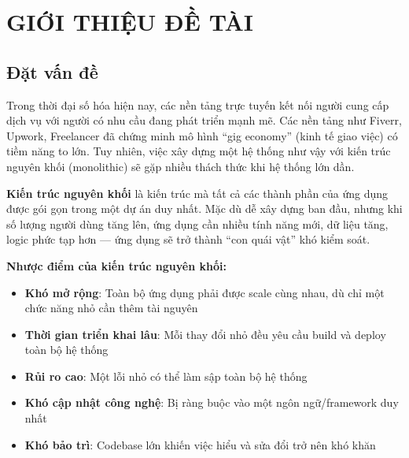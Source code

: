 \documentclass[12pt]{extreport}
\begin{document}
\cleardoublepage

\tableofcontents
\cleardoublepage

\listoffigures
{}
\cleardoublepage

\listoftables
{}
\cleardoublepage

\chapter{GIỚI THIỆU ĐỀ TÀI}

\section{Đặt vấn đề}

Trong thời đại số hóa hiện nay, các nền tảng trực tuyến kết nối người cung cấp dịch vụ với người có nhu cầu đang phát triển mạnh mẽ. Các nền tảng như Fiverr, Upwork, Freelancer đã chứng minh mô hình ``gig economy'' (kinh tế giao việc) có tiềm năng to lớn. Tuy nhiên, việc xây dựng một hệ thống như vậy với kiến trúc nguyên khối (monolithic) sẽ gặp nhiều thách thức khi hệ thống lớn dần.

\textbf{Kiến trúc nguyên khối} là kiến trúc mà tất cả các thành phần của ứng dụng được gói gọn trong một dự án duy nhất. Mặc dù dễ xây dựng ban đầu, nhưng khi số lượng người dùng tăng lên, ứng dụng cần nhiều tính năng mới, dữ liệu tăng, logic phức tạp hơn --- ứng dụng sẽ trở thành ``con quái vật'' khó kiểm soát.

\textbf{Nhược điểm của kiến trúc nguyên khối:}
\begin{itemize}
    \item \textbf{Khó mở rộng}: Toàn bộ ứng dụng phải được scale cùng nhau, dù chỉ một chức năng nhỏ cần thêm tài nguyên
    \item \textbf{Thời gian triển khai lâu}: Mỗi thay đổi nhỏ đều yêu cầu build và deploy toàn bộ hệ thống
    \item \textbf{Rủi ro cao}: Một lỗi nhỏ có thể làm sập toàn bộ hệ thống
    \item \textbf{Khó cập nhật công nghệ}: Bị ràng buộc vào một ngôn ngữ/framework duy nhất
    \item \textbf{Khó bảo trì}: Codebase lớn khiến việc hiểu và sửa đổi trở nên khó khăn
\end{itemize}
\end{document}
